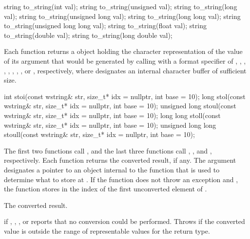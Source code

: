 %
\begin{itemdecl}
string to_string(int val);
string to_string(unsigned val);
string to_string(long val);
string to_string(unsigned long val);
string to_string(long long val);
string to_string(unsigned long long val);
string to_string(float val);
string to_string(double val);
string to_string(long double val);
\end{itemdecl}

\begin{itemdescr}
\pnum
\returns
Each function returns a  object holding the character
representation of the value of its argument that would be generated by calling
 with a format specifier of
,
,
,
,
,  ,
,
,
or , respectively, where  designates an internal
character buffer of sufficient size.
\end{itemdescr}

%
%
%
%
%
\begin{itemdecl}
int stoi(const wstring& str, size_t* idx = nullptr, int base = 10);
long stol(const wstring& str, size_t* idx = nullptr, int base = 10);
unsigned long stoul(const wstring& str, size_t* idx = nullptr, int base = 10);
long long stoll(const wstring& str, size_t* idx = nullptr, int base = 10);
unsigned long long stoull(const wstring& str, size_t* idx = nullptr, int base = 10);
\end{itemdecl}

\begin{itemdescr}
\pnum
\effects
The first two functions call ,
and the last three functions call ,
, and , respectively. Each function returns the converted result, if any. The
argument  designates a pointer to an object internal to the function
that is used to determine what to store at . If the function does
not throw an exception and , the function stores in 
the index of the first unconverted element of .

\pnum
\returns
The converted result.

\pnum
\throws
{} if , , , or
 reports that no conversion could be performed. Throws
 if the converted value is outside the range of representable values
for the return type.
\end{itemdescr}

